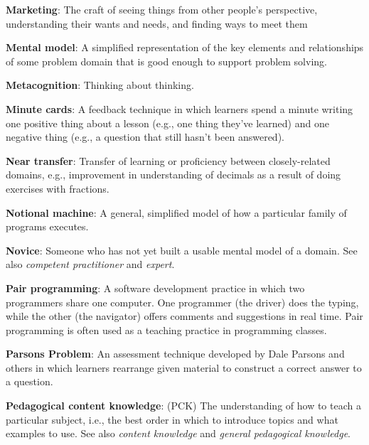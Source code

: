 \textbf{\hypertarget{g:marketing}{Marketing}\label{g:marketing}}: The craft of seeing things from
other people's perspective, understanding their wants and needs, and
finding ways to meet them

\textbf{\hypertarget{g:mental-model}{Mental model}\label{g:mental-model}}: A simplified representation
of the key elements and relationships of some problem domain that is
good enough to support problem solving.

\textbf{\hypertarget{g:metacognition}{Metacognition}\label{g:metacognition}}: Thinking about thinking.

\textbf{\hypertarget{g:minute-cards}{Minute cards}\label{g:minute-cards}}: A feedback technique in which
learners spend a minute writing one positive thing about a lesson (e.g.,
one thing they've learned) and one negative thing (e.g., a question that
still hasn't been answered).

\textbf{\hypertarget{g:near-transfer}{Near transfer}\label{g:near-transfer}}: Transfer of learning or
proficiency between closely-related domains, e.g., improvement in
understanding of decimals as a result of doing exercises with fractions.

\textbf{\hypertarget{g:notional-machine}{Notional machine}\label{g:notional-machine}}: A general, simplified
model of how a particular family of programs executes.

\textbf{\hypertarget{g:novice}{Novice}\label{g:novice}}: Someone who has not yet built a usable
mental model of a domain. See also \emph{competent practitioner} and
\emph{expert}.

\textbf{\hypertarget{g:pair-programming}{Pair programming}\label{g:pair-programming}}: A software
development practice in which two programmers share one computer. One
programmer (the driver) does the typing, while the other (the navigator)
offers comments and suggestions in real time. Pair programming is often
used as a teaching practice in programming classes.

\textbf{\hypertarget{g:parsons-problem}{Parsons Problem}\label{g:parsons-problem}}: An assessment technique
developed by Dale Parsons and others in which learners rearrange given
material to construct a correct answer to a question.

\textbf{\hypertarget{g:pedagogical-content-knowledge}{Pedagogical content knowledge}\label{g:pedagogical-content-knowledge}}:
(PCK) The understanding of how to teach a particular subject, i.e., the
best order in which to introduce topics and what examples to use. See
also \emph{content knowledge} and \emph{general pedagogical knowledge}.


